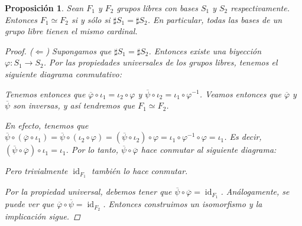 \documentclass[12pt]{book}
\newtheorem{prop}[teo]{Proposición}
\theoremstyle{definition}
\DeclareMathOperator{\id}{id}
\begin{document}
\begin{prop}
Sean $F_1$ y $F_2$ grupos libres con bases $S_1$ y $S_2$ respectivamente. Entonces $F_1\simeq F_2$ si y sólo si $\sharp S_1 =\sharp S_2$. En particular, todas las bases de un grupo libre tienen el mismo cardinal.
\begin{proof}
($\Longleftarrow$) Supongamos que $\sharp S_1 = \sharp S_2$. Entonces existe una biyección $\varphi :S_1\to S_2$. Por las propiedades universales de los grupos libres, tenemos el siguiente diagrama conmutativo:
\begin{center}
\end{center}
Tenemos entonces que $\overline{\varphi}\circ \iota_1 = \iota_2\circ\varphi$ y $\overline{\psi}\circ\iota_2 = \iota_1\circ \varphi^{-1}$. Veamos entonces que $\overline{\varphi}$ y $\overline{\psi}$ son inversas, y así tendremos que $F_1\simeq F_2$.

En efecto, tenemos que $\overline{\psi}\circ (\overline{\varphi}\circ \iota_1) = \overline{\psi}\circ(\iota_2\circ \varphi) = (\overline{\psi}\circ \iota_2)\circ \varphi = \iota_1\circ \varphi^{-1} \circ \varphi = \iota_1$. Es decir, $(\overline{\psi}\circ\overline{\varphi})\circ \iota_1 = \iota_1$. Por lo tanto, $\overline{\psi}\circ \overline{\varphi}$ hace conmutar al siguiente diagrama:

Pero trivialmente $\id_{F_1}$ también lo hace conmutar.

Por la propiedad universal, debemos tener que $\overline{\psi}\circ\overline{\varphi} = \id_{F_1}$. Análogamente, se puede ver que $\overline{\varphi}\circ\overline{\psi} = \id_{F_2}$. Entonces construimos un isomorfismo y la implicación sigue.


\end{proof}
\end{prop}
\end{document}
